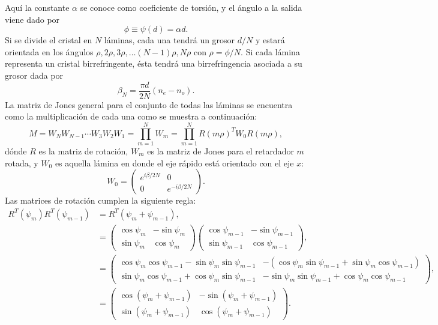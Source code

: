Aquí la constante $\alpha$
se conoce como coeficiente de torsión, y el ángulo a la salida viene
dado por $$\phi \equiv \psi(d)=\alpha d.$$ Si se divide el cristal en
$N$ láminas, cada una tendrá un grosor $d/N$ y estará orientada en los ángulos
$\rho,2\rho,3\rho,\dots\left(N-1\right)\rho,N\rho$ con
$\rho=\phi/N$. Si cada lámina representa un cristal birrefringente, ésta tendrá una
birrefringencia asociada a su grosor dada por $$\beta_N = \frac{\pi
  d}{2N}\left(n_e-n_o\right).$$
La matriz de Jones general para el conjunto de todas las láminas se
encuentra como la multiplicación de cada una como se muestra a
continuación:
\[ M= W_NW_{N-1}\cdots W_3W_2W_1=\prod_{m=1}^NW_m = \prod_{m=1}^NR(m\rho)^TW_0R(m\rho), \]
dónde $R$ es la matriz de rotación, $W_m$ es la matriz de Jones para
el retardador $m$ rotada, y $W_0$ es aquella lámina en donde el eje rápido está
orientado con el eje $x$:
\begin{equation*}
W_0 =
\begin{pmatrix}
  e^{i\beta/2N} &0 \\ 0 & e^{-i\beta/2N} 
\end{pmatrix}.
\end{equation*}
Las matrices de rotación cumplen la siguiente regla:
\begin{align*}
R^T(\psi_m)R^T(\psi_{m-1}) &= R^T\left(\psi_m+\psi_{m-1}\right),\\
&=
\begin{pmatrix}
  \cos{\psi_m}&  -\sin{\psi_m}\\  \sin{\psi_m}&  \cos{\psi_m}
\end{pmatrix}
\begin{pmatrix}
  \cos{\psi_{m-1}}&  -\sin{\psi_{m-1}}\\  \sin{\psi_{m-1}}&  \cos{\psi_{m-1}}
\end{pmatrix},\\
&=
\begin{pmatrix}
  \cos{\psi_m}\cos{\psi_{m-1}}-\sin{\psi_m}\sin{\psi_{m-1}}&  
-(\cos{\psi_m}\sin{\psi_{m-1}}+\sin{\psi_m} \cos{\psi_{m-1}})\\
  \sin{\psi_m} \cos{\psi_{m-1}}+\cos{\psi_m}\sin{\psi_{m-1}}& 
 -\sin{\psi_m}\sin{\psi_{m-1}}+\cos{\psi_m}\cos{\psi_{m-1}}
\end{pmatrix},  \\
&=\begin{pmatrix}
  \cos{\left(\psi_m+\psi_{m-1}\right)}&  -\sin{\left(\psi_m+\psi_{m-1}\right)}\\
  \sin{\left(\psi_m+\psi_{m-1}\right)}&  \cos{\left(\psi_m+\psi_{m-1}\right)} 
\end{pmatrix}.
\end{align*}
